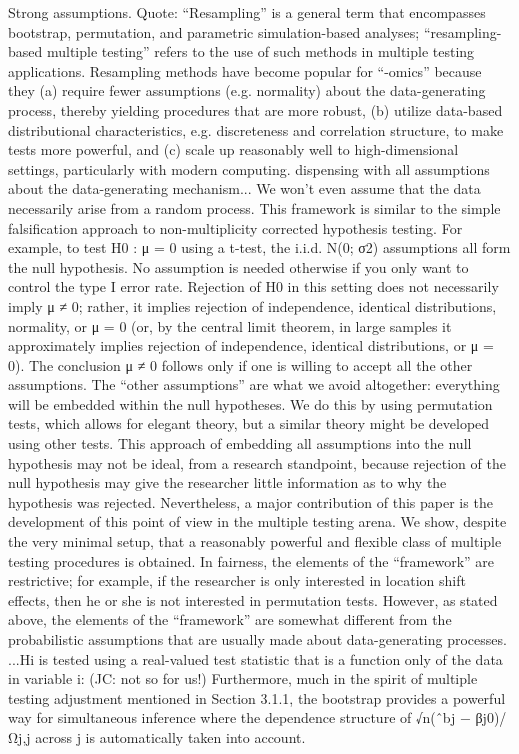 \documentclass{article}
\begin{document}
Strong assumptions.
Quote: “Resampling” is a general term that encompasses bootstrap, permutation, and parametric simulation-based analyses; “resampling-based multiple testing” refers to the use of such methods in multiple testing applications. Resampling methods have become popular for “-omics” because they (a) require fewer assumptions (e.g. normality) about the data-generating process, thereby yielding procedures that are more robust, (b) utilize data-based distributional characteristics, e.g. discreteness and correlation structure, to make tests more powerful, and (c) scale up reasonably well to high-dimensional settings, particularly with modern computing.
dispensing with all assumptions about the data-generating mechanism... We won't even assume that the data necessarily arise from a random process. This framework is similar to the simple falsification approach to non-multiplicity corrected hypothesis testing. For example, to test H0 : μ = 0 using a t-test, the i.i.d. N(0; σ2) assumptions all form the null hypothesis. No assumption is needed otherwise if you only want to control the type I error rate. Rejection of H0 in this setting does not necessarily imply μ ≠ 0; rather, it implies rejection of independence, identical distributions, normality, or μ = 0 (or, by the central limit theorem, in large samples it approximately implies rejection of independence, identical distributions, or μ = 0). The conclusion μ ≠ 0 follows only if one is willing to accept all the other assumptions. The “other assumptions” are what we avoid altogether: everything will be embedded within the null hypotheses. We do this by using permutation tests, which allows for elegant theory, but a similar theory might be developed using other tests. This approach of embedding all assumptions into the null hypothesis may not be ideal, from a research standpoint, because rejection of the null hypothesis may give the researcher little information as to why the hypothesis was rejected. Nevertheless, a major contribution of this paper is the development of this point of view in the multiple testing arena. We show, despite the very minimal setup, that a reasonably powerful and flexible class of multiple testing procedures is obtained.
In fairness, the elements of the “framework” are restrictive; for example, if the researcher is only interested in location shift effects, then he or she is not interested in permutation tests. However, as stated above, the elements of the “framework” are somewhat different from the probabilistic assumptions that are usually made about data-generating processes. ...Hi is tested using a real-valued test statistic that is a function only of the data in
variable i: (JC: not so for us!)
Furthermore, much in the spirit of multiple testing adjustment mentioned in Section 3.1.1, the bootstrap provides a powerful way for simultaneous inference where the dependence structure of √n(ˆbj − βj0)/ Ωj,j across j is automatically taken into account.
\end{document}

